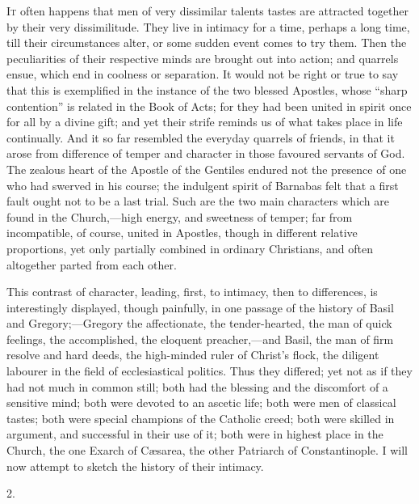 I\textsc{t} often happens that men of very dissimilar talents tastes are
attracted together by their very dissimilitude. They live in intimacy
for a time, perhaps a long time, till their circumstances alter, or
some sudden event comes to try them. Then the peculiarities of their
respective minds are brought out into action; and quarrels ensue,
which end in coolness or separation. It would not be right or true to
say that this is exemplified in the instance of the two blessed
Apostles, whose ``sharp contention'' is related in the Book of
Acts; for they had been united in spirit once for all by a divine
gift; and yet their strife reminds us of what takes place in life
continually. And it so far resembled the everyday quarrels of friends,
in that it arose from difference of temper and character in those
favoured servants of God. The zealous heart of the Apostle of the
Gentiles endured not the presence of one who had swerved in his
course; the indulgent spirit of Barnabas felt that a first fault ought
not to be a last trial. Such are the two main characters which are
found in the Church,—high energy, and sweetness of temper; far
from incompatible, of course, united in Apostles, though in different
relative proportions, yet only partially combined in ordinary
Christians, and often altogether parted from each other.

This contrast of character, leading, first, to intimacy, then to
differences, is interestingly displayed, though painfully, in one
passage of the history of Basil and Gregory;—Gregory the
affectionate, the tender-hearted, the man of quick feelings, the
accomplished, the eloquent preacher,—and Basil, the man of firm
resolve and hard deeds, the high-minded ruler of Christ's flock, the
diligent labourer in the field of ecclesiastical politics. Thus they
differed; yet not as if they had not much in common still; both had
the blessing and the discomfort of a sensitive mind; both were devoted
to an ascetic life; both were men of classical tastes; both were
special champions of the Catholic creed; both were skilled in
argument, and successful in their use of it; both were in highest
place in the Church, the one Exarch of Cæsarea, the other Patriarch
of Constantinople. I will now attempt to sketch the history of their
intimacy.

2.

